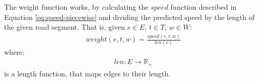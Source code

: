 The weight function works, by calculating the $speed$ function described in Equation \ref{eq:speed-piecewise} and dividing the predicted speed by the length of the given road segment. That is, given $e \in E$, $t \in T$, $w \in W$:
\begin{align}
weight(e,t,w) = \frac{speed(e,t,w)}{len(e)}
\end{align}
where:
\begin{align}
len:E \rightarrow \mathbb{R_+}
\end{align}
is a length function, that maps edges to their length.

